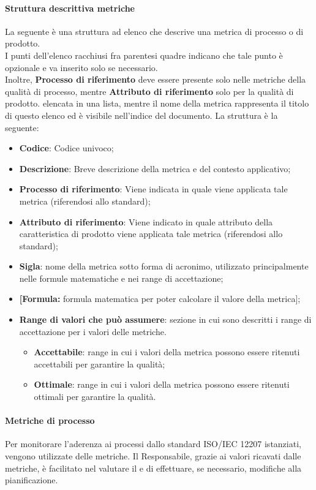 \paragraph{Struttura descrittiva metriche}
La seguente è una struttura ad elenco che descrive una metrica di processo o di prodotto. \\
I punti dell'elenco racchiusi fra parentesi quadre indicano che tale punto è opzionale e va inserito solo se necessario.\\
Inoltre, \textbf{Processo di riferimento} deve essere presente solo nelle metriche della qualità di processo, mentre \textbf{Attributo di riferimento} solo per la qualità di prodotto.
elencata in una lista, mentre il nome della metrica rappresenta il titolo di questo elenco ed è visibile nell'indice del documento. La struttura è la seguente:
\begin{itemize}
    \item \textbf{Codice}: Codice univoco;
    \item \textbf{Descrizione}: Breve descrizione della metrica e del contesto applicativo;
    \item \textbf{Processo di riferimento}: Viene indicata in quale  viene applicata tale metrica (riferendosi allo standard);
    \item \textbf{Attributo di riferimento}: Viene indicato in quale attributo della caratteristica di prodotto viene applicata tale metrica (riferendosi allo standard);
    \item \textbf{Sigla}: nome della metrica sotto forma di acronimo, utilizzato principalmente nelle formule matematiche e nei range di accettazione;
    \item \textbf{[Formula:} formula matematica per poter calcolare il valore della metrica];
    \item \textbf{Range di valori che può assumere}: sezione in cui sono descritti i range di accettazione per i valori delle metriche.
    \begin{itemize}
        \item \textbf{Accettabile}: range in cui i valori della metrica possono essere ritenuti accettabili per garantire la qualità;
        \item \textbf{Ottimale}: range in cui i valori della metrica possono essere ritenuti ottimali per garantire la qualità.
    \end{itemize}
\end{itemize}

\paragraph{Metriche di processo}
Per monitorare l'aderenza ai processi dallo standard ISO/IEC 12207 istanziati, vengono utilizzate delle metriche. Il Responsabile, grazie ai valori ricavati dalle metriche, è facilitato nel valutare il  e di effettuare, se necessario, modifiche alla pianificazione.

